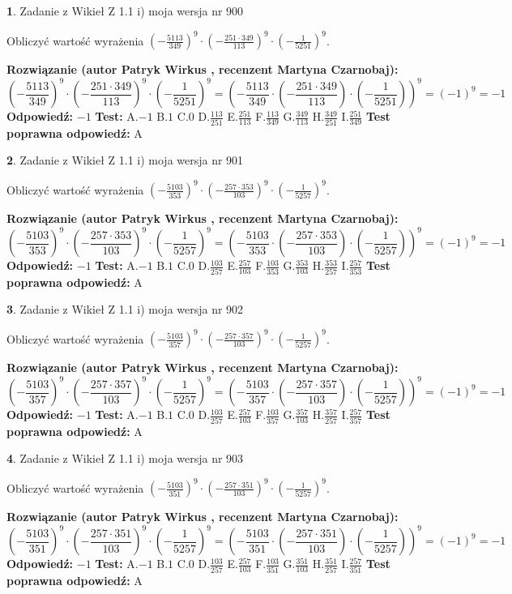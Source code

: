 \documentclass[12pt, a4paper]{article}
\theoremstyle{definition} %
\newtheorem{zad}{}
\newcommand{\zadStart}[1]{\begin{zad}#1\newline}
\newcommand{\zadStop}{\end{zad}}
\newcommand{\rozwStart}[2]{\noindent \textbf{Rozwiązanie (autor #1 , recenzent #2): }\newline}
\newcommand{\rozwStop}{\newline}
\newcommand{\odpStart}{\noindent \textbf{Odpowiedź:}\newline}
\newcommand{\odpStop}{\newline}
\newcommand{\testStart}{\noindent \textbf{Test:}\newline}
\newcommand{\testStop}{\newline}
\newcommand{\kluczStart}{\noindent \textbf{Test poprawna odpowiedź:}\newline}
\newcommand{\kluczStop}{\newline}
\begin{document}
\zadStart{Zadanie z Wikieł Z 1.1 i) moja wersja nr 900}

Obliczyć wartość wyrażenia $(-\frac{5113}{349})^{9} \cdot (-\frac{251 \cdot 349}{113})^{9} \cdot (-\frac{1}{5251})^{9}$.
\zadStop
\rozwStart{Patryk Wirkus}{Martyna Czarnobaj}
$$(-\frac{5113}{349})^{9} \cdot (-\frac{251 \cdot 349}{113})^{9} \cdot (-\frac{1}{5251})^{9} = (-\frac{5113}{349} \cdot (-\frac{251 \cdot 349}{113}) \cdot (-\frac{1}{5251}))^{9} = (-1)^{9} = -1$$
\rozwStop
\odpStart
$-1$
\odpStop
\testStart
A.$-1$ B.$1$ C.$0$ D.$\frac{113}{251}$ E.$\frac{251}{113}$
F.$\frac{113}{349}$ G.$\frac{349}{113}$
H.$\frac{349}{251}$
I.$\frac{251}{349}$
\testStop
\kluczStart
A
\kluczStop



\zadStart{Zadanie z Wikieł Z 1.1 i) moja wersja nr 901}

Obliczyć wartość wyrażenia $(-\frac{5103}{353})^{9} \cdot (-\frac{257 \cdot 353}{103})^{9} \cdot (-\frac{1}{5257})^{9}$.
\zadStop
\rozwStart{Patryk Wirkus}{Martyna Czarnobaj}
$$(-\frac{5103}{353})^{9} \cdot (-\frac{257 \cdot 353}{103})^{9} \cdot (-\frac{1}{5257})^{9} = (-\frac{5103}{353} \cdot (-\frac{257 \cdot 353}{103}) \cdot (-\frac{1}{5257}))^{9} = (-1)^{9} = -1$$
\rozwStop
\odpStart
$-1$
\odpStop
\testStart
A.$-1$ B.$1$ C.$0$ D.$\frac{103}{257}$ E.$\frac{257}{103}$
F.$\frac{103}{353}$ G.$\frac{353}{103}$
H.$\frac{353}{257}$
I.$\frac{257}{353}$
\testStop
\kluczStart
A
\kluczStop



\zadStart{Zadanie z Wikieł Z 1.1 i) moja wersja nr 902}

Obliczyć wartość wyrażenia $(-\frac{5103}{357})^{9} \cdot (-\frac{257 \cdot 357}{103})^{9} \cdot (-\frac{1}{5257})^{9}$.
\zadStop
\rozwStart{Patryk Wirkus}{Martyna Czarnobaj}
$$(-\frac{5103}{357})^{9} \cdot (-\frac{257 \cdot 357}{103})^{9} \cdot (-\frac{1}{5257})^{9} = (-\frac{5103}{357} \cdot (-\frac{257 \cdot 357}{103}) \cdot (-\frac{1}{5257}))^{9} = (-1)^{9} = -1$$
\rozwStop
\odpStart
$-1$
\odpStop
\testStart
A.$-1$ B.$1$ C.$0$ D.$\frac{103}{257}$ E.$\frac{257}{103}$
F.$\frac{103}{357}$ G.$\frac{357}{103}$
H.$\frac{357}{257}$
I.$\frac{257}{357}$
\testStop
\kluczStart
A
\kluczStop



\zadStart{Zadanie z Wikieł Z 1.1 i) moja wersja nr 903}

Obliczyć wartość wyrażenia $(-\frac{5103}{351})^{9} \cdot (-\frac{257 \cdot 351}{103})^{9} \cdot (-\frac{1}{5257})^{9}$.
\zadStop
\rozwStart{Patryk Wirkus}{Martyna Czarnobaj}
$$(-\frac{5103}{351})^{9} \cdot (-\frac{257 \cdot 351}{103})^{9} \cdot (-\frac{1}{5257})^{9} = (-\frac{5103}{351} \cdot (-\frac{257 \cdot 351}{103}) \cdot (-\frac{1}{5257}))^{9} = (-1)^{9} = -1$$
\rozwStop
\odpStart
$-1$
\odpStop
\testStart
A.$-1$ B.$1$ C.$0$ D.$\frac{103}{257}$ E.$\frac{257}{103}$
F.$\frac{103}{351}$ G.$\frac{351}{103}$
H.$\frac{351}{257}$
I.$\frac{257}{351}$
\testStop
\kluczStart
A
\kluczStop
\end{document}

